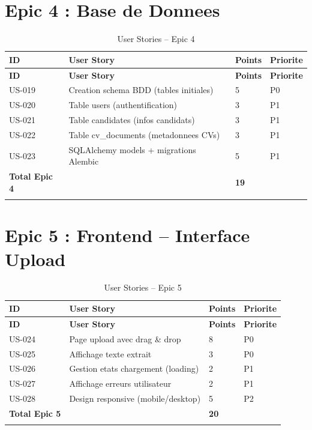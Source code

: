 ﻿\documentclass[12pt,a4paper]{report}
\begin{document}
\section{Epic 4 : Base de Donnees}

\begin{longtable}{|p{1.5cm}|p{7cm}|p{2cm}|p{2cm}|}
\hline
\rowcolor{bleu3S!20}
\textbf{ID} & \textbf{User Story} & \textbf{Points} & \textbf{Priorite} \\
\hline
\endfirsthead
\hline \rowcolor{bleu3S!20} \textbf{ID} & \textbf{User Story} & \textbf{Points} & \textbf{Priorite} \\ \hline
\endhead
US-019 & Creation schema BDD (tables initiales) & 5 & P0 \\ \hline
US-020 & Table users (authentification) & 3 & P1 \\ \hline
US-021 & Table candidates (infos candidats) & 3 & P1 \\ \hline
US-022 & Table cv\_documents (metadonnees CVs) & 3 & P1 \\ \hline
US-023 & SQLAlchemy models + migrations Alembic & 5 & P1 \\ \hline
\rowcolor{grisleger} \textbf{Total Epic 4} & & \textbf{19} & \\ \hline
\caption{User Stories -- Epic 4}
\end{longtable}

\section{Epic 5 : Frontend -- Interface Upload}

\begin{longtable}{|p{1.5cm}|p{7cm}|p{2cm}|p{2cm}|}
\hline
\rowcolor{bleu3S!20}
\textbf{ID} & \textbf{User Story} & \textbf{Points} & \textbf{Priorite} \\
\hline
\endfirsthead
\hline \rowcolor{bleu3S!20} \textbf{ID} & \textbf{User Story} & \textbf{Points} & \textbf{Priorite} \\ \hline
\endhead
US-024 & Page upload avec drag \& drop & 8 & P0 \\ \hline
US-025 & Affichage texte extrait & 3 & P0 \\ \hline
US-026 & Gestion etats chargement (loading) & 2 & P1 \\ \hline
US-027 & Affichage erreurs utilisateur & 2 & P1 \\ \hline
US-028 & Design responsive (mobile/desktop) & 5 & P2 \\ \hline
\rowcolor{grisleger} \textbf{Total Epic 5} & & \textbf{20} & \\ \hline
\caption{User Stories -- Epic 5}
\end{longtable}
\end{document}
